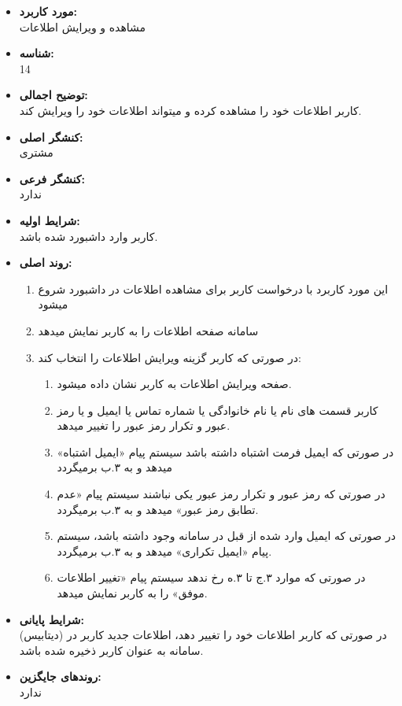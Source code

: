 \documentclass{article}
\begin{document}
\begin{itemize}
\item \textbf{مورد کاربرد:}\\
مشاهده و ویرایش اطلاعات
\item \textbf{شناسه:}\\
14
\item \textbf{توضیح اجمالی:}\\
کاربر اطلاعات خود را مشاهده کرده و میتواند اطلاعات خود را ویرایش کند.
\item \textbf{کنشگر اصلی:}\\
مشتری
\item \textbf{کنشگر فرعی:}\\
ندارد
\item \textbf{شرایط اولیه:}\\
کاربر وارد داشبورد شده باشد.
\item \textbf{روند اصلی:}\\
\begin{enumerate}
\item  این مورد کاربرد با درخواست کاربر برای مشاهده اطلاعات در داشبورد شروع میشود
\item سامانه صفحه  اطلاعات را به کاربر نمایش میدهد
\item در صورتی که کاربر گزینه ویرایش اطلاعات را انتخاب کند:
\begin{enumerate}
\item صفحه ویرایش اطلاعات به کاربر نشان داده میشود.
\item کاربر قسمت های نام یا نام خانوادگی یا شماره تماس یا ایمیل و یا رمز عبور و تکرار رمز عبور را تغییر میدهد.
\item  در صورتی که ایمیل فرمت اشتباه داشته باشد سیستم پیام «ایمیل اشتباه» میدهد و به ۳.ب برمیگردد
\item در صورتی که رمز عبور و تکرار رمز عبور یکی نباشند سیستم پیام «عدم تطابق رمز عبور» میدهد و به ۳.ب برمیگردد.
\item در صورتی که ایمیل وارد شده از قبل در سامانه وجود داشته باشد، سیستم پیام «ایمیل تکراری» میدهد و به ۳.ب برمیگردد.
\item در صورتی که موارد ۳.ج تا ۳.ه رخ ندهد سیستم پیام «تغییر اطلاعات موفق» را به کاربر نمایش میدهد.
\end{enumerate}
\end{enumerate}
\item \textbf{شرایط پایانی:}\\ 
در صورتی که کاربر اطلاعات خود را تغییر دهد، اطلاعات جدید کاربر در (دیتابیس) سامانه به عنوان کاربر ذخیره شده باشد.
\item \textbf{روندهای جایگزین:}\\
ندارد
\end{itemize}
\noindent\makebox[\linewidth]{\rule{\paperwidth}{0.4pt}}
\end{document}
